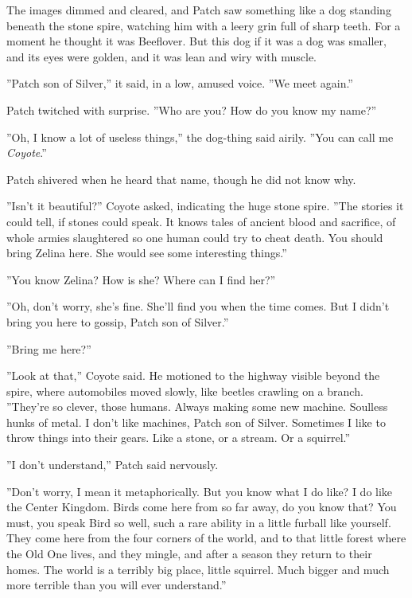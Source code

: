 \documentclass[12pt]{book}
\begin{document}
 The images dimmed and cleared, and Patch saw something like a dog standing beneath the stone spire, watching him with a leery grin full of sharp teeth. For a moment he thought it was Beeflover. But this dog %
 if it was a dog %
 was smaller, and its eyes were golden, and it was lean and wiry with muscle.\par
 ''Patch son of Silver,'' it said, in a low, amused voice. ''We meet again.''\par
 Patch twitched with surprise. ''Who are you? How do you know my name?''\par
 ''Oh, I know a lot of useless things,'' the dog-thing said airily. ''You can call me {\it Coyote}.''\par
 Patch shivered when he heard that name, though he did not know why.\par
 ''Isn't it beautiful?'' Coyote asked, indicating the huge stone spire. ''The stories it could tell, if stones could speak. It knows tales of ancient blood and sacrifice, of whole armies slaughtered so one human could try to cheat death. You should bring Zelina here. She would see some interesting things.''\par
 ''You know Zelina? How is she? Where can I find her?''\par
 ''Oh, don't worry, she's fine. She'll find you when the time comes. But I didn't bring you here to gossip, Patch son of Silver.''\par
 ''Bring me here?''\par
 ''Look at that,'' Coyote said. He motioned to the highway visible beyond the spire, where automobiles moved slowly, like beetles crawling on a branch. ''They're so clever, those humans. Always making some new machine. Soulless hunks of metal. I don't like machines, Patch son of Silver. Sometimes I like to throw things into their gears. Like a stone, or a stream. Or a squirrel.''\par
 ''I don't understand,'' Patch said nervously.\par
 ''Don't worry, I mean it metaphorically. But you know what I do like? I do like the Center Kingdom. Birds come here from so far away, do you know that? You must, you speak Bird so well, such a rare ability in a little furball like yourself. They come here from the four corners of the world, and to that little forest where the Old One lives, and they mingle, and after a season they return to their homes. The world is a terribly big place, little squirrel. Much bigger and much more terrible than you will ever understand.''\par
\end{document}
